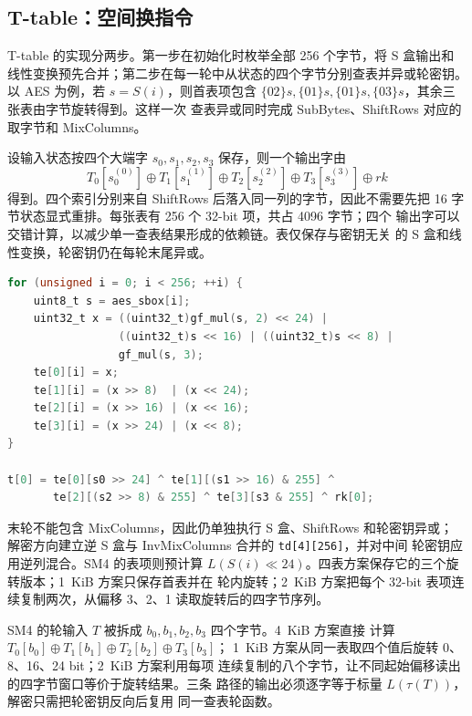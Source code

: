 \documentclass[11pt,a4paper,UTF8,fontset=none]{ctexart}
\begin{document}
\subsection{T-table：空间换指令}

T-table 的实现分两步。第一步在初始化时枚举全部 256 个字节，将 S 盒输出和
线性变换预先合并；第二步在每一轮中从状态的四个字节分别查表并异或轮密钥。
以 AES 为例，若 $s=S(i)$，则首表项包含
$\{02\}s,\{01\}s,\{01\}s,\{03\}s$，其余三张表由字节旋转得到。这样一次
查表异或同时完成 SubBytes、ShiftRows 对应的取字节和 MixColumns。

设输入状态按四个大端字 \(s_0,s_1,s_2,s_3\) 保存，则一个输出字由
\[
 T_0[s_0^{(0)}]\oplus T_1[s_1^{(1)}]\oplus
 T_2[s_2^{(2)}]\oplus T_3[s_3^{(3)}]\oplus rk
\]
得到。四个索引分别来自 ShiftRows 后落入同一列的字节，因此不需要先把
16 字节状态显式重排。每张表有 256 个 32-bit 项，共占 4096 字节；四个
输出字可以交错计算，以减少单一查表结果形成的依赖链。表仅保存与密钥无关
的 S 盒和线性变换，轮密钥仍在每轮末尾异或。

\begin{lstlisting}[language=C,caption={AES T-table 的构造与一列轮更新（src/aes.c）}]
for (unsigned i = 0; i < 256; ++i) {
    uint8_t s = aes_sbox[i];
    uint32_t x = ((uint32_t)gf_mul(s, 2) << 24) |
                 ((uint32_t)s << 16) | ((uint32_t)s << 8) |
                 gf_mul(s, 3);
    te[0][i] = x;
    te[1][i] = (x >> 8)  | (x << 24);
    te[2][i] = (x >> 16) | (x << 16);
    te[3][i] = (x >> 24) | (x << 8);
}

t[0] = te[0][s0 >> 24] ^ te[1][(s1 >> 16) & 255] ^
       te[2][(s2 >> 8) & 255] ^ te[3][s3 & 255] ^ rk[0];
\end{lstlisting}

末轮不能包含 MixColumns，因此仍单独执行 S 盒、ShiftRows 和轮密钥异或；
解密方向建立逆 S 盒与 InvMixColumns 合并的 \texttt{td[4][256]}，并对中间
轮密钥应用逆列混合。SM4 的表项则预计算
$L(S(i)\ll24)$。四表方案保存它的三个旋转版本；1~KiB 方案只保存首表并在
轮内旋转；2~KiB 方案把每个 32-bit 表项连续复制两次，从偏移 3、2、1
读取旋转后的四字节序列。

SM4 的轮输入 \(T\) 被拆成 \(b_0,b_1,b_2,b_3\) 四个字节。4~KiB 方案直接
计算 \(T_0[b_0]\oplus T_1[b_1]\oplus T_2[b_2]\oplus T_3[b_3]\)；
1~KiB 方案从同一表取四个值后旋转 0、8、16、24 bit；2~KiB 方案利用每项
连续复制的八个字节，让不同起始偏移读出的四字节窗口等价于旋转结果。三条
路径的输出必须逐字等于标量 \(L(\tau(T))\)，解密只需把轮密钥反向后复用
同一查表轮函数。
\end{document}
